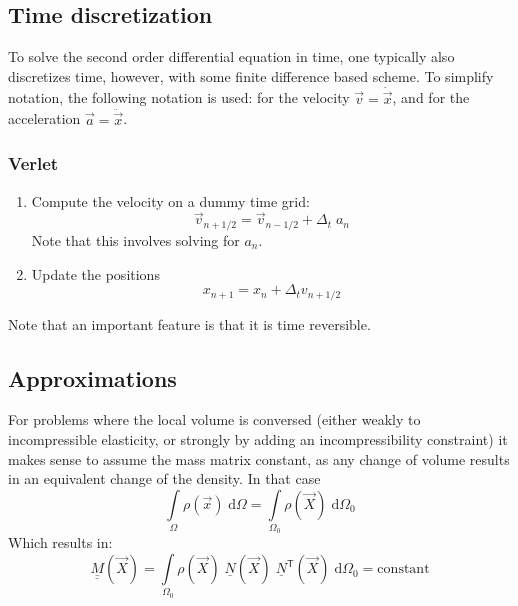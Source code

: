 \documentclass[times,namecite]{goose-article}
\begin{document}
\subsection{Time discretization}
\label{eq:dynamics:time}

To solve the second order differential equation in time, one typically also discretizes time, however, with some finite difference based scheme. To simplify notation, the following notation is used: for the velocity $\vec{v} = \dot{\vec{x}}$, and for the acceleration $\vec{a} = \ddot{\vec{x}}$.

\subsubsection{Verlet}

\begin{enumerate}
  \item Compute the velocity on a dummy time grid:
  \begin{equation}
    \vec{v}_{n+1/2} = \vec{v}_{n-1/2} + \Delta_t \; a_n
  \end{equation}
  Note that this involves solving for $a_n$.
  \item Update the positions
  \begin{equation}
    x_{n+1} = x_n + \Delta_t v_{n + 1/2}
  \end{equation}
\end{enumerate}

Note that an important feature is that it is time reversible.

\subsection{Approximations}

For problems where the local volume is conversed (either weakly to incompressible elasticity, or strongly by adding an incompressibility constraint) it makes sense to assume the mass matrix constant, as any change of volume results in an equivalent change of the density. In that case
\begin{equation}
  \int\limits_{\Omega}
    \rho(\vec{x})
  \;\mathrm{d}\Omega
  =
  \int\limits_{\Omega_0}
    \rho(\vec{X})
  \;\mathrm{d}\Omega_0
\end{equation}
Which results in:
\begin{equation}
  \underline{\underline{M}}(\vec{X})
  =
  \int\limits_{\Omega_0}
    \rho(\vec{X})\; \underline{N}(\vec{X})\; \underline{N}^\mathsf{T}(\vec{X}) \;
  \mathrm{d}\Omega_0
  =
  \mathrm{constant}
\end{equation}
\end{document}
